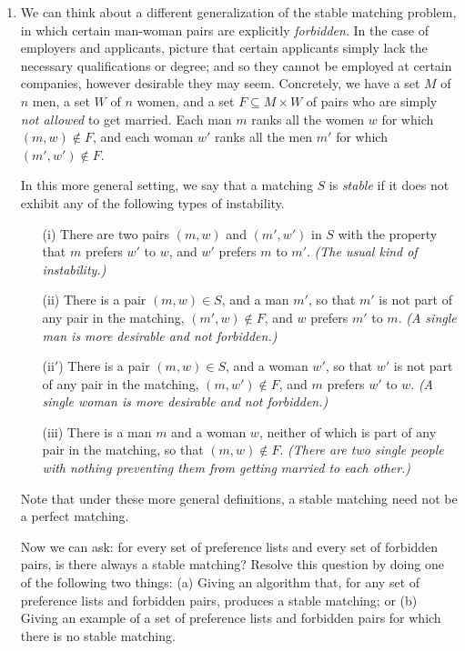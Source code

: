 \documentclass[12pt]{article}
\begin{document}
\begin{enumerate}

\item

We can think about a
different generalization of the stable matching problem, in
which certain man-woman pairs are explicitly {\em forbidden}.
In the case of employers and applicants, picture that certain
applicants simply lack the necessary qualifications or degree;
and so they cannot be employed at certain companies,
however desirable they may seem.
Concretely, we have a set $M$ of $n$ men, a set $W$
of $n$ women, and a set $F \subseteq M \times W$
of pairs who are simply {\em not allowed} to get married.
Each man $m$ ranks all the women $w$ for which $(m,w) \not\in F$,
and each woman $w'$ ranks all the men $m'$ for which $(m',w') \not\in F$.

In this more general setting, we say that a matching $S$ is {\em stable}
if it does not exhibit any of the following types of instability.
\begin{itemize}
\item[(i)] There are two pairs $(m,w)$ and $(m',w')$ in $S$
with the property that $m$ prefers $w'$ to $w$,
and $w'$ prefers $m$ to $m'$.
{\em (The usual kind of instability.)}
\item[(ii)] There is a pair $(m,w) \in S$, and a man $m'$,
so that $m'$ is not part of any pair in the matching,
$(m',w) \not\in F$, and $w$ prefers $m'$ to $m$.
{\em (A single man is more desirable and not forbidden.)}
\item[(ii$'$)] There is a pair $(m,w) \in S$, and a woman $w'$,
so that $w'$ is not part of any pair in the matching,
$(m,w') \not\in F$, and $m$ prefers $w'$ to $w$.
{\em (A single woman is more desirable and not forbidden.)}
\item[(iii)] There is a man $m$ and a woman $w$,
neither of which is part of any pair in the matching,
so that $(m,w) \not\in F$.
{\em (There are two single people with nothing preventing
them from getting married to each other.)}
\end{itemize}
Note that under these more general definitions, a stable matching
need not be a perfect matching.

Now we can ask:
for every set of preference lists and every set of forbidden pairs,
is there always a stable matching?
Resolve this question by doing one of the following two things:
(a) Giving an algorithm that, for any set of
preference lists and forbidden pairs,
produces a stable matching;
or (b) Giving an example of a set of preference lists and forbidden pairs
for which there is no stable matching.


\end{enumerate}
\end{document}
